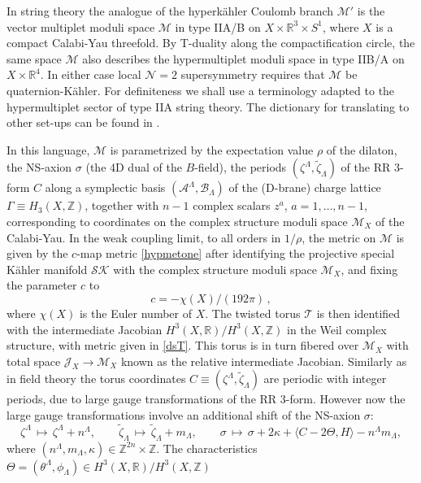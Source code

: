\documentclass[12pt,reqno]{article}
\numberwithin{equation}{section}
\newcommand{\be}{\begin{equation}}
\newcommand{\ee}{\end{equation}}
\newcommand{\cA}{\mathcal{A}}
\newcommand{\cB}{\mathcal{B}}
\newcommand{\cS}{\mathcal{S}}
\newcommand{\cK}{\mathcal{K}}
\newcommand{\cM}{\mathcal{M}}
\newcommand{\cN}{\mathcal{N}}
\newcommand{\cT}{\mathcal{T}}
\newcommand{\cJ}{\mathcal{J}}
\newcommand{\qk}{{quaternion-K\"ahler}\xspace}
\def\pcM{\cM'}
\numberwithin{equation}{section}
\begin{document}
In string theory the analogue of the hyperk\"ahler Coulomb branch $\pcM$
is the vector multiplet moduli space $\cM$ in type IIA/B on $X\times \mathbb{R}^{3}\times S^{1}$,
where $X$ is a compact Calabi-Yau threefold. By T-duality along the compactification
circle, the same space $\cM$ also describes the hypermultiplet moduli space
in type IIB/A on $X\times \mathbb{R}^4$. In either case local $\cN=2$ supersymmetry
requires that $\cM$ be \qk \cite{Bagger:1983tt}. For definiteness we shall use
a terminology adapted to the hypermultiplet sector of type IIA string theory.
The dictionary for translating to other set-ups can be found
in \cite{Alexandrov:2008gh,Alexandrov:2010ca}.

In this language, $\cM$
is parametrized by the expectation value $\rho$ of the dilaton, the NS-axion $\sigma$
(the 4D dual of the $B$-field), the periods $(\zeta^{\Lambda}, \tilde\zeta_\Lambda)$
of the RR 3-form $C$ along a symplectic basis $(\cA^{\Lambda}, \cB_\Lambda)$ of
the (D-brane) charge lattice $\Gamma\equiv H_{3}(X, \mathbb{Z})$, together with
$n-1$ complex scalars $z^{a}$, $a=1, \dots, n-1$, corresponding to coordinates
on the complex structure moduli space $\cM_X$ of the Calabi-Yau.
In the weak coupling limit, to all orders in $1/\rho$, the metric on $\cM$
is given by the $c$-map metric \eqref{hypmetone}
after identifying the projective special K\"ahler manifold $\cS\cK$ with
the complex structure moduli space $\cM_X$, and fixing the parameter $c$ to
\be
\label{cval}
c= -\chi(X)/(192 \pi)\, ,
\ee
where $\chi(X)$ is the Euler number of $X$.
The twisted torus $\cT$ is then identified
with the intermediate Jacobian $H^{3}(X, \mathbb{R})/H^3(X, \mathbb{Z})$
in the Weil complex structure, with metric given in \eqref{dsT}. This torus is in turn
fibered over $\cM_X$ with total space $\cJ_X\rightarrow \cM_X$ known as the relative
intermediate Jacobian.
Similarly as in field theory the torus coordinates $C\equiv (\zeta^{\Lambda}, \tilde\zeta_\Lambda)$
are periodic with integer periods, due to  large gauge transformations of the RR 3-form.
However now the large gauge transformations involve an
additional  shift of the NS-axion $\sigma$:
\be
\zeta^{\Lambda}\,\mapsto\,\zeta^\Lambda+n^{\Lambda},
\qquad
\tilde\zeta_\Lambda\,\mapsto\, \tilde\zeta_\Lambda+m_\Lambda,
\qquad
\sigma \,\mapsto\,\sigma +2\kappa +\langle C-2\Theta,H\rangle -n^\Lambda m_\Lambda,
\label{Heisenberg}
\ee
where $(n^\Lambda,m_\Lambda, \kappa)\in \mathbb{Z}^{2n}\times \mathbb{Z}$.
The characteristics $\Theta=(\theta^{\Lambda}, \phi_\Lambda)\in
H^{3}(X, \mathbb{R})/H^3(X, \mathbb{Z})$
\end{document}
